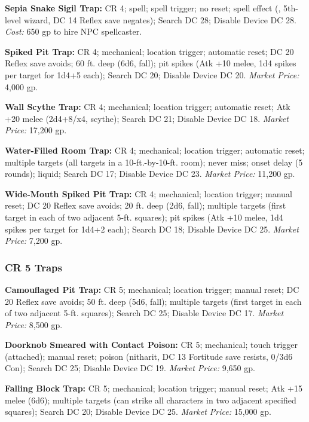 \textbf{Sepia Snake Sigil Trap:} CR 4; spell; spell trigger; 
no reset; spell effect (, 5th-level wizard, DC 14 Reflex 
save negates); Search DC 28; Disable Device DC 28. \textit{Cost:} 650 gp to hire 
NPC spellcaster.

\textbf{Spiked Pit Trap:} CR 4; mechanical; location trigger; automatic reset; 
DC 20 Reflex save avoids; 60 ft. deep (6d6, fall); pit spikes (Atk +10 melee, 1d4 
spikes per target for 1d4+5 each); Search DC 20; Disable Device DC 20. \textit{Market 
Price:} 4,000 gp. 

\textbf{Wall Scythe Trap:} CR 4; mechanical; location trigger; automatic reset; 
Atk +20 melee (2d4+8/x4, scythe); Search DC 21; Disable Device DC 18. \textit{Market 
Price:} 17,200 gp.

\textbf{Water-Filled Room Trap:} CR 4; mechanical; location trigger; automatic 
reset; multiple targets (all targets in a 10-ft.-by-10-ft. room); never miss; onset 
delay (5 rounds); liquid; Search DC 17; Disable Device DC 23. \textit{Market Price: 
}11,200 gp.

\textbf{Wide-Mouth Spiked Pit Trap:} CR 4; mechanical; location trigger; manual 
reset; DC 20 Reflex save avoids; 20 ft. deep (2d6, fall); multiple targets (first 
target in each of two adjacent 5-ft. squares); pit spikes (Atk +10 melee, 1d4 spikes 
per target for 1d4+2 each); Search DC 18; Disable Device DC 25. \textit{Market 
Price:} 7,200 gp.

\subsubsection{CR 5 Traps}

\textbf{Camouflaged Pit Trap:} CR 5; mechanical; location trigger; manual reset; 
DC 20 Reflex save avoids; 50 ft. deep (5d6, fall); multiple targets (first target 
in each of two adjacent 5-ft. squares); Search DC 25; Disable Device DC 17. \textit{Market 
Price:} 8,500 gp.

\textbf{Doorknob Smeared with Contact Poison:} CR 5; mechanical; touch trigger 
(attached); manual reset; poison (nitharit, DC 13 Fortitude save resists, 0/3d6 
Con); Search DC 25; Disable Device DC 19. \textit{Market Price:} 9,650 gp.

\textbf{Falling Block Trap:} CR 5; mechanical; location trigger; manual reset; 
Atk +15 melee (6d6); multiple targets (can strike all characters in two adjacent 
specified squares); Search DC 20; Disable Device DC 25. \textit{Market Price:} 15,000 
gp.

